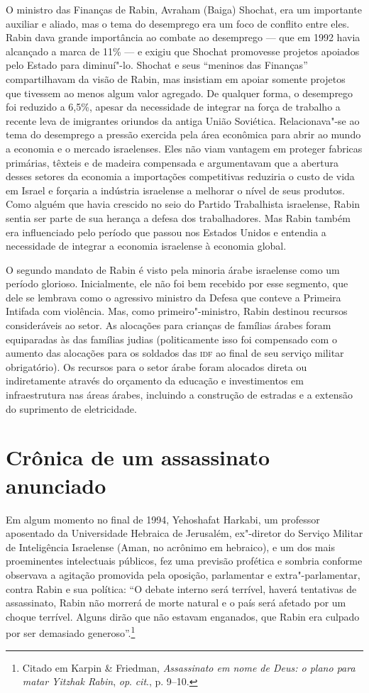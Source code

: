O ministro das Finanças de Rabin, Avraham (Baiga) Shochat, era um
importante auxiliar e aliado, mas o tema do desemprego era um foco de
conflito entre eles. Rabin dava grande importância ao combate ao
desemprego --- que em 1992 havia alcançado a marca de 11\% --- e exigiu que
Shochat promovesse projetos apoiados pelo Estado para diminuí"-lo.
Shochat e seus ``meninos das Finanças'' compartilhavam da visão de Rabin,
mas insistiam em apoiar somente projetos que tivessem ao menos algum
valor agregado. De qualquer forma, o desemprego foi reduzido a 6,5\%,
apesar da necessidade de integrar na força de trabalho a recente leva de
imigrantes oriundos da antiga União Soviética. Relacionava"-se ao tema do
desemprego a pressão exercida pela área econômica para abrir ao mundo a
economia e o mercado israelenses. Eles não viam vantagem em proteger
fabricas primárias, têxteis e de madeira compensada e argumentavam que a
abertura desses setores da economia a importações competitivas reduziria
o custo de vida em Israel e forçaria a indústria israelense a melhorar o
nível de seus produtos. Como alguém que havia crescido no seio do
Partido Trabalhista israelense, Rabin sentia ser parte de sua herança a
defesa dos trabalhadores. Mas Rabin também era influenciado pelo período
que passou nos Estados Unidos e entendia a necessidade de integrar a
economia israelense à economia global.

O segundo mandato de Rabin é visto pela minoria árabe israelense como um
período glorioso. Inicialmente, ele não foi bem recebido por esse
segmento, que dele se lembrava como o agressivo ministro da Defesa que
conteve a Primeira Intifada com violência. Mas, como primeiro"-ministro,
Rabin destinou recursos consideráveis ao setor. As alocações para
crianças de famílias árabes foram equiparadas às das famílias judias
(politicamente isso foi compensado com o aumento das alocações para os
soldados das \textsc{idf} ao final de seu serviço militar obrigatório). Os
recursos para o setor árabe foram alocados direta ou indiretamente
através do orçamento da educação e investimentos em infraestrutura nas
áreas árabes, incluindo a construção de estradas e a extensão do
suprimento de eletricidade.

\section{Crônica de um assassinato anunciado}

Em algum momento no final de 1994, Yehoshafat Harkabi, um professor
aposentado da Universidade Hebraica de Jerusalém, ex"-diretor do Serviço
Militar de Inteligência Israelense (Aman, no acrônimo em hebraico), e um dos mais proeminentes intelectuais
públicos, fez uma previsão profética e sombria conforme observava a
agitação promovida pela oposição, parlamentar e extra"-parlamentar,
contra Rabin e sua política: ``O debate interno será terrível, haverá
tentativas de assassinato, Rabin não morrerá de morte natural e o país
será afetado por um choque terrível. Alguns dirão que não estavam
enganados, que Rabin era culpado por ser demasiado generoso''.\footnote{Citado em Karpin
\& Friedman, \emph{Assassinato em nome de Deus: o plano para matar Yitzhak
Rabin}, \emph{op}. \emph{cit}., p. 9--10.}

